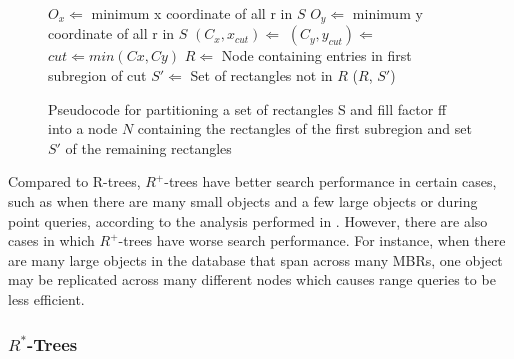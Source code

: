 \begin{figure}
\begin{algorithmic}
		\EndIf
		\State $O_{x} \Leftarrow$ minimum x coordinate of all r in $S$
		\State $O_{y} \Leftarrow$ minimum y coordinate of all r in $S$
		\State $(C_{x}, x_{cut}) \Leftarrow$ 
		\State $(C_{y}, y_{cut}) \Leftarrow$ 
		\State $cut \Leftarrow min(Cx, Cy)$
		\State $R \Leftarrow$ Node containing entries in first subregion of cut
		\State $S' \Leftarrow$ Set of rectangles not in $R$ 
		\Return ($R$, $S'$)
	\EndFunction
\end{algorithmic}
\caption{Pseudocode for partitioning a set of rectangles S and fill factor ff into
	a node $N$ containing the rectangles of the first subregion and set $S'$ of
	the remaining rectangles}
\label{fig:R+_Tree_Partition}
\end{figure}


Compared to R-trees, $R^{+}$-trees have better search performance in certain cases,
such as when there are many small objects and a few large objects or during point 
queries, according to the analysis performed in \cite{DBLP:conf/vldb/SellisRF87}. 
However, there are also cases in which $R^{+}$-trees have worse search performance. 
For instance, when there are many large objects in the database that span across many
MBRs, one object may be replicated across many different nodes which causes range
queries to be less efficient.

\subsubsection{$R^{*}$-Trees}




